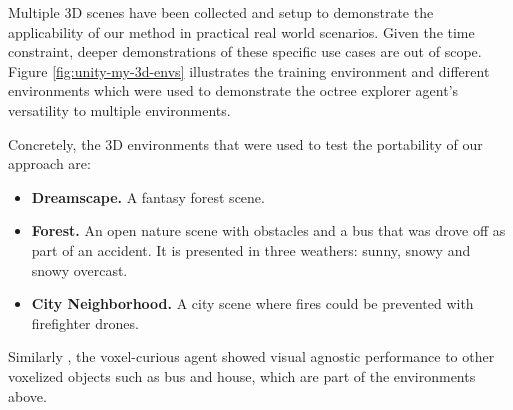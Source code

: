 

Multiple 3D scenes have been collected and setup to demonstrate the applicability of our method in practical real world scenarios. Given the time constraint, deeper demonstrations of these specific use cases are out of scope.
Figure \ref{fig:unity-my-3d-envs} illustrates the training environment and different environments which were used to demonstrate the octree explorer agent's versatility to multiple environments.

\newpage
Concretely, the 3D environments that were used to test the portability of our approach are: 
\begin{itemize}
    \item \textbf{Dreamscape.} A fantasy forest scene.
    \item \textbf{Forest.} An open nature scene with obstacles and a bus that was drove off as part of an accident. It is presented in three weathers: sunny, snowy and snowy overcast.
    \item \textbf{City Neighborhood.} A city scene where fires could be prevented with firefighter drones.
\end{itemize}

Similarly , the voxel-curious agent showed visual agnostic performance to other voxelized objects such as bus and house, which are part of the environments above. 




